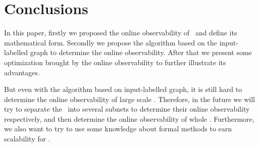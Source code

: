 \section{Conclusions}
\label{sec:con}
In this paper, firstly we proposed the online observability of \BCNs\ and define its mathematical form. Secondly we propose the algorithm based on the input-labelled graph to determine the online observability. 
After that we present some optimization brought by the online observability to further illustrate its advantages. 


But even with the algorithm based on input-labelled graph, it is still hard to determine the online observability of large scale \BCNs. Therefore, in the future we will try to separate the \BCN\ into several subnets to determine their online observability respectively, and then determine the online observability of whole \BCN. Furthermore, we also want to try to use some knowledge about formal methods to earn scalability for \BCNs. 

